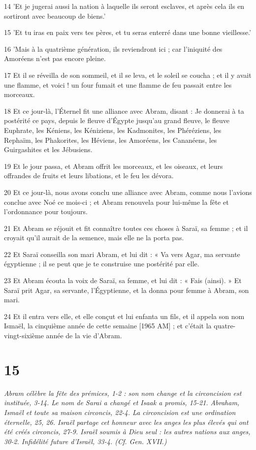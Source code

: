 \par 14 'Et je jugerai aussi la nation à laquelle ils seront esclaves, et après cela ils en sortiront avec beaucoup de biens.'
\par 15 'Et tu iras en paix vers tes pères, et tu seras enterré dans une bonne vieillesse.'
\par 16 'Mais à la quatrième génération, ils reviendront ici ; car l'iniquité des Amoréens n'est pas encore pleine.
\par 17 Et il se réveilla de son sommeil, et il se leva, et le soleil se coucha ; et il y avait une flamme, et voici ! un four fumait et une flamme de feu passait entre les morceaux.
\par 18 Et ce jour-là, l'Éternel fit une alliance avec Abram, disant : Je donnerai à ta postérité ce pays, depuis le fleuve d'Égypte jusqu'au grand fleuve, le fleuve Euphrate, les Kéniens, les Kéniziens, les Kadmonites, les Phéréziens, les Rephaïm, les Phakorites, les Héviens, les Amoréens, les Cananéens, les Guirgashites et les Jébusiens.
\par 19 Et le jour passa, et Abram offrit les morceaux, et les oiseaux, et leurs offrandes de fruits et leurs libations, et le feu les dévora.
\par 20 Et ce jour-là, nous avons conclu une alliance avec Abram, comme nous l'avions conclue avec Noé ce mois-ci ; et Abram renouvela pour lui-même la fête et l'ordonnance pour toujours.
\par 21 Et Abram se réjouit et fit connaître toutes ces choses à Saraï, sa femme ; et il croyait qu'il aurait de la semence, mais elle ne la porta pas.
\par 22 Et Saraï conseilla son mari Abram, et lui dit : « Va vers Agar, ma servante égyptienne ; il se peut que je te construise une postérité par elle.
\par 23 Et Abram écouta la voix de Saraï, sa femme, et lui dit : « Fais (ainsi). » Et Saraï prit Agar, sa servante, l'Égyptienne, et la donna pour femme à Abram, son mari.
\par 24 Et il entra vers elle, et elle conçut et lui enfanta un fils, et il appela son nom Ismaël, la cinquième année de cette semaine [1965 AM] ; et c'était la quatre-vingt-sixième année de la vie d'Abram.

\chapter{15}

\par \textit{Abram célèbre la fête des prémices, 1-2 : son nom change et la circoncision est instituée, 3-14. Le nom de Sarai a changé et Isaak a promis, 15-21. Abraham, Ismaël et toute sa maison circoncis, 22-4. La circoncision est une ordination éternelle, 25, 26. Israël partage cet honneur avec les anges les plus élevés qui ont été créés circoncis, 27-9. Israël soumis à Dieu seul : les autres nations aux anges, 30-2. Infidélité future d'Israël, 33-4. (Cf. Gen. XVII.)}


